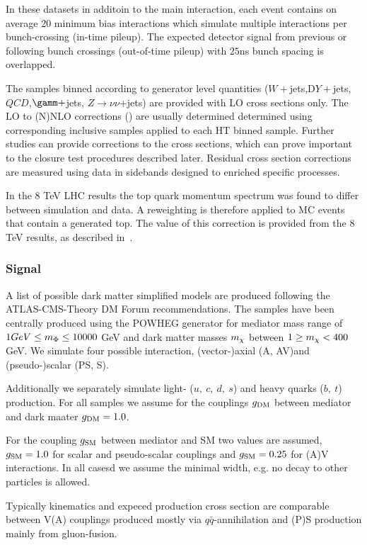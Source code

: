 In these datasets in additoin to the main interaction, each event contains on average 20 minimum bias interactions which simulate multiple interactions per bunch-crossing (in-time pileup). The expected detector signal from previous or following bunch crossings (out-of-time pileup) with $25$ns bunch spacing is overlapped.


The samples binned according to generator level quantities  
($W+$jets,D$Y+$jets,$QCD$,$\gamm+$jets, $Z\to \nu \nu$+jets) are provided with LO cross sections only. The LO to (N)NLO corrections (\kfactors) are usually determined determined using corresponding inclusive samples applied to each HT binned sample. Further studies can provide corrections to the cross sections, which can prove important to the closure test procedures described later. Residual cross section corrections are measured using data in sidebands designed to enriched specific processes.


In the $8$ TeV LHC results the top quark momentum spectrum was found to differ between
simulation and data. A reweighting is therefore applied to MC events that contain a generated top. The value of this correction is provided from the 8 TeV results, as described in~\cite{twiki-TopPtReweighting}.

\subsubsection{Signal}

A list of possible dark matter simplified models are produced following the ATLAS-CMS-Theory DM Forum recommendations. The samples have been centrally produced using the \textsc{POWHEG} generator for mediator mass range of $1 GeV \le m_{\Phi}\le 10000$ GeV and dark matter masses $m_{\chi}$ between $1 \ge m_{\chi} < 400$ GeV. We simulate four possible interaction, (vector-)axial (A, AV)and (pseudo-)scalar (PS, S).

Additionally we separately simulate light- ($u,~c,~d,~s$) and heavy quarks ($b,~t$) production. For all samples we assume for the couplings  $g_{\textrm{DM}}$ between mediator and dark maater $g_{\textrm{DM}}=1.0$. 

For the coupling $g_{\textrm{SM}}$ between mediator and SM two values are assumed, $g_{\textrm{SM}}=1.0$ for scalar and pseudo-scalar couplings and $g_{\textrm{SM}}=0.25$ for (A)V interactions. In all casesd we assume the minimal width, e.g. no decay to other particles is allowed.

Typically kinematics and expeced production cross section are comparable between V(A) couplings produced mostly via $q\bar{q}$-annihilation and (P)S production mainly from gluon-fusion.


